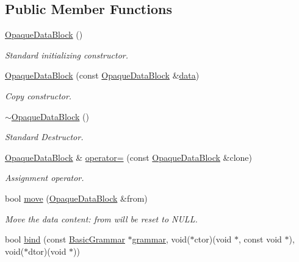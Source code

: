 \subsection*{Public Member Functions}
\begin{DoxyCompactItemize}
\item 
\hyperlink{class_d_d4hep_1_1_opaque_data_block_a1c0cf067c26869fcb636fbfed8002c73}{Opaque\+Data\+Block} ()
\begin{DoxyCompactList}\small\item\em Standard initializing constructor. \end{DoxyCompactList}\item 
\hyperlink{class_d_d4hep_1_1_opaque_data_block_a5c97af2f7c4130d78158040c2a95ab34}{Opaque\+Data\+Block} (const \hyperlink{class_d_d4hep_1_1_opaque_data_block}{Opaque\+Data\+Block} \&\hyperlink{class_d_d4hep_1_1_opaque_data_block_a200e53deafdc5f74aadd47e066357c04}{data})
\begin{DoxyCompactList}\small\item\em Copy constructor. \end{DoxyCompactList}\item 
\hyperlink{class_d_d4hep_1_1_opaque_data_block_a175f12bf6af71e59c1334cbb4099b4b3}{$\sim$\+Opaque\+Data\+Block} ()
\begin{DoxyCompactList}\small\item\em Standard Destructor. \end{DoxyCompactList}\item 
\hyperlink{class_d_d4hep_1_1_opaque_data_block}{Opaque\+Data\+Block} \& \hyperlink{class_d_d4hep_1_1_opaque_data_block_a9fa632b86dc6203b7077c9f09cb23853}{operator=} (const \hyperlink{class_d_d4hep_1_1_opaque_data_block}{Opaque\+Data\+Block} \&clone)
\begin{DoxyCompactList}\small\item\em Assignment operator. \end{DoxyCompactList}\item 
bool \hyperlink{class_d_d4hep_1_1_opaque_data_block_a488c26189a1d06ed642a335be951af7b}{move} (\hyperlink{class_d_d4hep_1_1_opaque_data_block}{Opaque\+Data\+Block} \&from)
\begin{DoxyCompactList}\small\item\em Move the data content\+: \textquotesingle{}from\textquotesingle{} will be reset to N\+U\+LL. \end{DoxyCompactList}\item 
bool \hyperlink{class_d_d4hep_1_1_opaque_data_block_a237aa4d85136b95af80cd46be06a1053}{bind} (const \hyperlink{class_d_d4hep_1_1_basic_grammar}{Basic\+Grammar} $\ast$\hyperlink{class_d_d4hep_1_1_opaque_data_ac911f7e23be3e5d583bf5ccebae03e31}{grammar}, void($\ast$ctor)(void $\ast$, const void $\ast$), void($\ast$dtor)(void $\ast$))

\end{DoxyCompactItemize}
